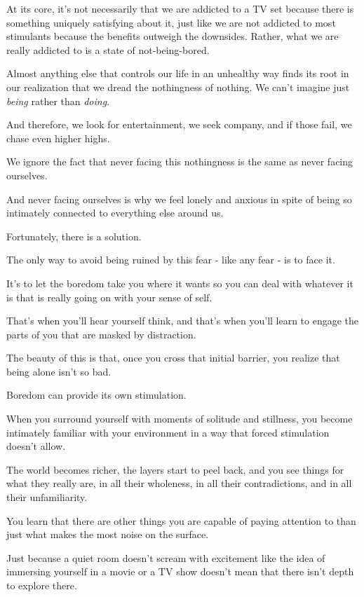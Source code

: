\documentclass{article}
\begin{document}
%
At its core, it's not necessarily that we are addicted to a TV set because there is something uniquely satisfying about it, just like we are not addicted to most stimulants because the benefits outweigh the downsides. Rather, what we are really addicted to is a state of not-being-bored.

%
Almost anything else that controls our life in an unhealthy way finds its root in our realization that we dread the nothingness of nothing. We can't imagine just \textit{being} rather than \textit{doing}.

And therefore, we look for entertainment, we seek company, and if those fail, we chase even higher highs.

%
We ignore the fact that never facing this nothingness is the same as never facing ourselves.

And never facing ourselves is why we feel lonely and anxious in spite of being so intimately connected to everything else around us.

%
Fortunately, there is a solution.

The only way to avoid being ruined by this fear - like any fear - is to face it.

It's to let the boredom take you where it wants so you can deal with whatever it is that is really going on with your sense of self.

That's when you'll hear yourself think, and that's when you'll learn to engage the parts of you that are masked by distraction.

%
The beauty of this is that, once you cross that initial barrier, you realize that being alone isn't so bad.

Boredom can provide its own stimulation.

%
When you surround yourself with moments of solitude and stillness, you become intimately familiar with your environment in a way that forced stimulation doesn't allow.

The world becomes richer, the layers start to peel back, and you see things for what they really are, in all their wholeness, in all their contradictions, and in all their unfamiliarity.

%
You learn that there are other things you are capable of paying attention to than just what makes the most noise on the surface.

Just because a quiet room doesn't scream with excitement like the idea of immersing yourself in a movie or a TV show doesn't mean that there isn't depth to explore there.
\end{document}
